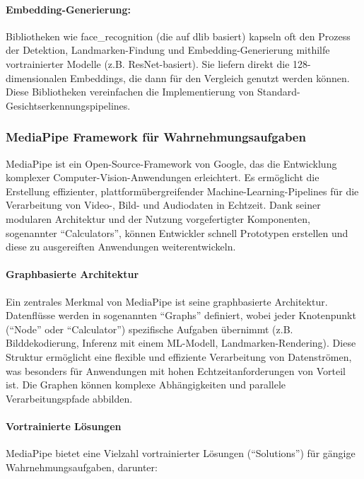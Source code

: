 \paragraph{Embedding-Generierung:} 
Bibliotheken wie face\_recognition (die auf dlib basiert) kapseln oft den Prozess der Detektion, Landmarken-Findung und Embedding-Generierung mithilfe vortrainierter Modelle (z.B. ResNet-basiert). Sie liefern direkt die 128-dimensionalen Embeddings, die dann für den Vergleich genutzt werden können. Diese Bibliotheken vereinfachen die Implementierung von Standard-Gesichtserkennungspipelines.

\subsubsection{MediaPipe Framework für Wahrnehmungsaufgaben}

MediaPipe ist ein Open-Source-Framework von Google, das die Entwicklung komplexer Computer-Vision-Anwendungen erleichtert. Es ermöglicht die Erstellung effizienter, plattformübergreifender Machine-Learning-Pipelines für die Verarbeitung von Video-, Bild- und Audiodaten in Echtzeit. Dank seiner modularen Architektur und der Nutzung vorgefertigter Komponenten, sogenannter ``Calculators'', können Entwickler schnell Prototypen erstellen und diese zu ausgereiften Anwendungen weiterentwickeln.

\paragraph{Graphbasierte Architektur}
Ein zentrales Merkmal von MediaPipe ist seine graphbasierte Architektur. Datenflüsse werden in sogenannten ``Graphs'' definiert, wobei jeder Knotenpunkt (``Node'' oder ``Calculator'') spezifische Aufgaben übernimmt (z.B. Bilddekodierung, Inferenz mit einem ML-Modell, Landmarken-Rendering). Diese Struktur ermöglicht eine flexible und effiziente Verarbeitung von Datenströmen, was besonders für Anwendungen mit hohen Echtzeitanforderungen von Vorteil ist. Die Graphen können komplexe Abhängigkeiten und parallele Verarbeitungspfade abbilden.

\paragraph{Vortrainierte Lösungen}
MediaPipe bietet eine Vielzahl vortrainierter Lösungen (``Solutions'') für gängige Wahrnehmungsaufgaben, darunter:

